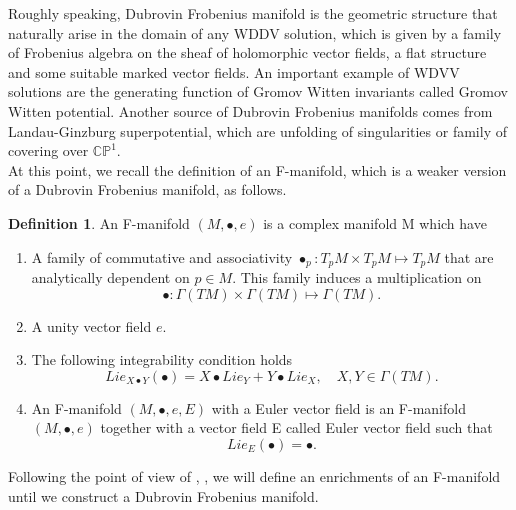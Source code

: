 \documentclass{article}
\theoremstyle{definition}
\newtheorem{definition}{Definition}[section]
\begin{document}
Roughly speaking, Dubrovin Frobenius manifold is the geometric structure that naturally arise in the domain of any WDDV solution, which is given by a family of Frobenius algebra on the sheaf of holomorphic vector fields, a flat structure and some suitable marked vector fields. An important example of WDVV solutions are the generating function of Gromov Witten invariants called Gromov Witten potential. Another source of Dubrovin Frobenius manifolds comes from Landau-Ginzburg superpotential, which are  unfolding of singularities or family of covering over $\mathbb{CP}^1$.\\

At this point, we recall the definition of an F-manifold, which is a weaker version of a Dubrovin Frobenius manifold, as follows.\\


\begin{definition}\cite{David} \cite{Hertling}
An F-manifold $(M, \bullet, e)$ is a complex manifold M which have
\begin{enumerate}
\item A family of commutative and associativity $\bullet_p : T_pM \times T_pM \mapsto T_pM$ that are analytically dependent on $p \in M$. This family induces a multiplication on 
\begin{equation*}
\bullet : \Gamma(TM) \times \Gamma(TM) \mapsto \Gamma(TM).
\end{equation*}

\item A unity vector field $e$.
\item The following integrability condition holds
\begin{equation*}
Lie_{X\bullet Y}(\bullet)=X\bullet Lie_{Y}+Y\bullet Lie_{X}, \quad X,Y \in \Gamma(TM).
\end{equation*}
\item An F-manifold $(M,\bullet,e,E)$ with a Euler vector field is an F-manifold $(M, \bullet, e)$ together with a vector field E called Euler vector field such that
\begin{equation*}
Lie_E(\bullet)=\bullet.
\end{equation*}
\end{enumerate}
\end{definition}



Following the point of view of \cite{David}, \cite{Hertling} , we will define an enrichments of an
F-manifold until we construct a Dubrovin Frobenius manifold.\\
\end{document}
